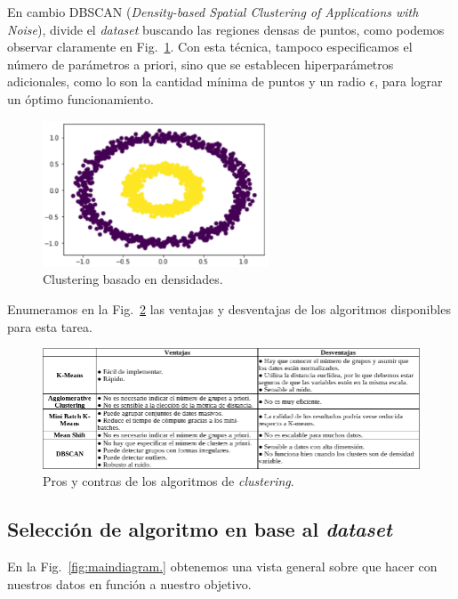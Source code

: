 \documentclass[a4paper,12pt]{article}
\begin{document}
En cambio DBSCAN (\textit{Density-based Spatial Clustering of Applications with Noise}), divide el \textit{dataset} buscando las regiones densas de puntos, como podemos observar claramente en Fig.~\ref{fig:DBSCAN.}. Con esta técnica, tampoco especificamos el número de parámetros a priori, sino que se establecen hiperparámetros adicionales, como lo son la cantidad mínima de puntos y un radio $\epsilon$, para lograr un óptimo funcionamiento.

\begin{figure}[H]
	\begin{center}				
		\includegraphics[width=0.6\textwidth]{tesis_17.png}
		\caption{Clustering basado en densidades.}
		\label{fig:DBSCAN.}
	\end{center}
\end{figure}

Enumeramos en la Fig.~\ref{fig:proconsclustering.} las ventajas y desventajas de los algoritmos disponibles para esta tarea.

\begin{figure}[H]
	\begin{center}				
		\includegraphics[width=1\textwidth]{tesis_34.png}
		\caption{Pros y contras de los algoritmos de \textit{clustering}.}
		\label{fig:proconsclustering.}
	\end{center}
\end{figure}

\clearpage

\subsection{Selección de algoritmo en base al \textit{dataset}}
En la Fig.~\ref{fig:maindiagram.} obtenemos una vista general sobre que hacer con nuestros datos en función a nuestro objetivo.
\end{document}
